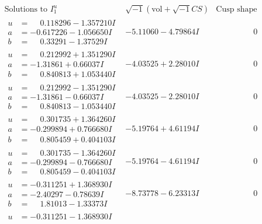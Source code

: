 \documentclass[1p]{elsarticle_modified}
\theoremstyle{definition}
\newcommand{\I}{\sqrt{-1}}
\begin{document}
$$\begin{array}{c|c|c}
\text{Solutions to }I^u_{1}& \I (\text{vol} + \sqrt{-1}CS) & \text{Cusp shape}\\
 \hline 
\begin{aligned}
u &= \phantom{-}0.118296 - 1.357210 I \\
a &= -0.617226 - 1.056650 I \\
b &= \phantom{-}0.33291 - 1.37529 I\end{aligned}
 & -5.11060 - 4.79864 I & \phantom{-0.000000 } 0 \\ \hline\begin{aligned}
u &= \phantom{-}0.212992 + 1.351290 I \\
a &= -1.31861 + 0.66037 I \\
b &= \phantom{-}0.840813 + 1.053440 I\end{aligned}
 & -4.03525 + 2.28010 I & \phantom{-0.000000 } 0 \\ \hline\begin{aligned}
u &= \phantom{-}0.212992 - 1.351290 I \\
a &= -1.31861 - 0.66037 I \\
b &= \phantom{-}0.840813 - 1.053440 I\end{aligned}
 & -4.03525 - 2.28010 I & \phantom{-0.000000 } 0 \\ \hline\begin{aligned}
u &= \phantom{-}0.301735 + 1.364260 I \\
a &= -0.299894 + 0.766680 I \\
b &= \phantom{-}0.805459 + 0.404103 I\end{aligned}
 & -5.19764 + 4.61194 I & \phantom{-0.000000 } 0 \\ \hline\begin{aligned}
u &= \phantom{-}0.301735 - 1.364260 I \\
a &= -0.299894 - 0.766680 I \\
b &= \phantom{-}0.805459 - 0.404103 I\end{aligned}
 & -5.19764 - 4.61194 I & \phantom{-0.000000 } 0 \\ \hline\begin{aligned}
u &= -0.311251 + 1.368930 I \\
a &= -2.40297 - 0.78639 I \\
b &= \phantom{-}1.81013 - 1.33373 I\end{aligned}
 & -8.73778 - 6.23313 I & \phantom{-0.000000 } 0 \\ \hline\begin{aligned}
u &= -0.311251 - 1.368930 I \\

\end{aligned}
\end{array}$$
\end{document}
